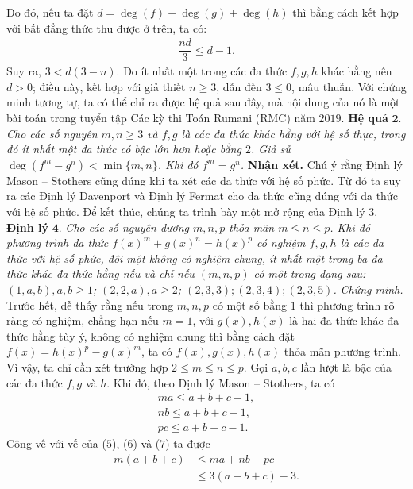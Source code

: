 \begin{multicols}{2}
	Do đó, nếu ta đặt $d=\deg(f) + \deg(g) + \deg(h)$ thì bằng cách kết hợp với bất đẳng thức thu được ở trên, ta có:
	\begin{align*}
		\dfrac{nd}{3} \le d - 1.
	\end{align*}
	Suy ra, $3 < d(3-n).$ Do ít nhất một trong các đa thức $f, g, h$ khác hằng nên $d >0$; điều này, kết hợp với giả thiết $n\ge 3$, dẫn đến $3\le 0$, mâu thuẫn. 
	\vskip 0.1cm
	Với chứng minh tương tự, ta có thể chỉ ra được hệ quả sau đây, mà nội dung của nó là một bài toán trong tuyển tập Các kỳ thi Toán Rumani (RMC) năm $2019$.
	\vskip 0.1cm
	\textbf{\color{hoccungpi}Hệ quả} $\pmb{2.}$ \textit{Cho các số nguyên $m,n\ge 3$ và $f,g$ là các đa thức khác hằng với hệ số thực, trong đó ít nhất một đa thức có bậc lớn hơn hoặc bằng $2$. Giả sử $\deg (f^m-g^n)<\min \{m,n\}$. Khi đó $f^m=g^n$.}
	\vskip 0.1cm
	\textbf{\color{hoccungpi}Nhận xét.}
	Chú ý rằng  Định lý Mason -- Stothers cũng đúng khi ta xét các đa thức với hệ số phức. Từ đó ta suy ra các Định lý Davenport và Định lý Fermat cho đa thức cũng đúng với đa thức với hệ số phức.
	\vskip 0.1cm
	Để kết thúc, chúng ta trình bày một mở rộng của Định lý $3$.
	\vskip 0.1cm
	\textbf{\color{hoccungpi}Định lý} $\pmb{4.}$ \textit{Cho các số nguyên dương $m,n,p$ thỏa mãn $m\leq n\leq p$. Khi đó phương trình đa thức $f(x)^m+g(x)^n=h(x)^p$ có nghiệm $f,g,h$ là các đa thức với hệ số phức, đôi một không có nghiệm chung, ít nhất một trong ba đa thức khác đa thức hằng nếu và chỉ nếu $(m,n,p)$ có một trong dạng sau: $(1,a,b), a,b\ge 1$; $(2,2,a), a\ge 2$; $(2,3,3); (2,3,4); (2,3,5)$.}
	\vskip 0.1cm
	\textit{Chứng minh.}
	Trước hết, dễ thấy rằng nếu trong $m, n, p$ có một số bằng $1$ thì phương trình rõ ràng có nghiệm, chẳng hạn nếu $m=1$, với $g(x),h(x)$ là hai đa thức khác đa thức hằng tùy ý, không có nghiệm chung thì bằng cách đặt $f(x)=h(x)^p-g(x)^m$, ta có $f(x), g(x), h(x)$ thỏa mãn phương trình.
	\vskip 0.1cm
	Vì vậy, ta chỉ cần xét trường hợp $ 2 \le m \le n \le p$. Gọi $a, b, c$ lần lượt là bậc của các đa thức $f, g$ và $h$. Khi đó, theo Định lý Mason -- Stothers, ta có
	\begin{align*}
		ma \le a + b + c - 1, \tag{$5$}\\
		nb \le a + b + c - 1, \tag{$6$}\\
		pc \le a + b + c - 1. \tag{$7$}
	\end{align*}
	Cộng vế với vế của ($5$), ($6$) và ($7$) ta được
	\begin{align*}
		m(a+ b + c) &\le ma + nb + pc \\
		&\le 3(a + b + c) - 3.
	\end{align*}

\end{multicols}
